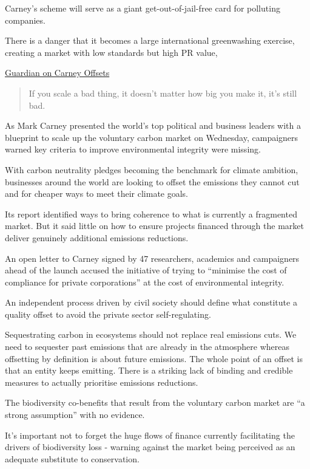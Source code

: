 \documentclass[
]{book}
\begin{document}
Carney's scheme will serve as a giant get-out-of-jail-free card for polluting companies.

There is a danger that it becomes a large international greenwashing exercise, creating a market with low standards but high PR value,

\href{https://www.theguardian.com/environment/2021/jan/27/green-groups-raise-concerns-over-carney-carbon-credits-plan}{Guardian on Carney Offsets}

\begin{quote}
If you scale a bad thing, it doesn't matter how big you make it, it's still bad.
\end{quote}

As Mark Carney presented the world's top political and business leaders with a blueprint to scale up the voluntary carbon market on Wednesday, campaigners warned key criteria to improve environmental integrity were missing.

With carbon neutrality pledges becoming the benchmark for climate ambition, businesses around the world are looking to offset the emissions they cannot cut and for cheaper ways to meet their climate goals.

Its report identified ways to bring coherence to what is currently a fragmented market. But it said little on how to ensure projects financed through the market deliver genuinely additional emissions reductions.

An open letter to Carney signed by 47 researchers, academics and campaigners ahead of the launch accused the initiative of trying to ``minimise the cost of compliance for private corporations'' at the cost of environmental integrity.

An independent process driven by civil society should define what constitute a quality offset to avoid the private sector self-regulating.

Sequestrating carbon in ecosystems should not replace real emissions cuts.
We need to sequester past emissions that are already in the atmosphere whereas offsetting by definition is about future emissions. The whole point of an offset is that an entity keeps emitting. There is a striking lack of binding and credible measures to actually prioritise emissions reductions.

The biodiversity co-benefits that result from the voluntary carbon market are ``a strong assumption'' with no evidence.

It's important not to forget the huge flows of finance currently facilitating the drivers of biodiversity loss - warning against the market being perceived as an adequate substitute to conservation.
\end{document}
